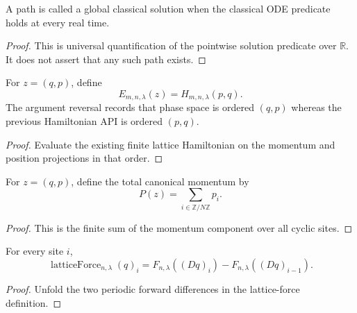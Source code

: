 \begin{definition}
\label{def:microscopic:global-classical-solution}
A path is called a global classical solution when the classical ODE predicate
holds at every real time.
\end{definition}
\begin{proof}

\leanok
This is universal quantification of the pointwise solution predicate over
$\mathbb R$.  It does not assert that any such path exists.
\end{proof}

\begin{definition}
\label{def:microscopic:hamiltonian-energy}
For $z=(q,p)$, define
\[
  E_{m,n,\lambda}(z)=H_{m,n,\lambda}(p,q).
\]
The argument reversal records that phase space is ordered $(q,p)$ whereas the
previous Hamiltonian API is ordered $(p,q)$.
\end{definition}
\begin{proof}

\leanok
Evaluate the existing finite lattice Hamiltonian on the momentum and position
projections in that order.
\end{proof}

\begin{definition}
\label{def:microscopic:total-momentum}
For $z=(q,p)$, define the total canonical momentum by
\[
  P(z)=\sum_{i\in\mathbb Z/N\mathbb Z}p_i.
\]
\end{definition}
\begin{proof}

\leanok
This is the finite sum of the momentum component over all cyclic sites.
\end{proof}

\begin{theorem}
\label{thm:microscopic:lattice-force-apply}
For every site $i$,
\[
 \operatorname{latticeForce}_{n,\lambda}(q)_i
 =F_{n,\lambda}((Dq)_i)-F_{n,\lambda}((Dq)_{i-1}).
\]
\end{theorem}
\begin{proof}

\leanok
Unfold the two periodic forward differences in the lattice-force definition.
\end{proof}

